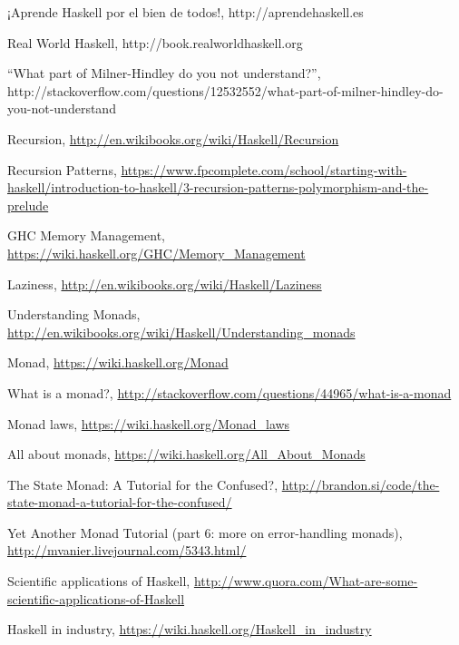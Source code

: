 \documentclass[a4paper]{article}
\begin{document}
\clearpage
\begin{thebibliography}{3}

  ¡Aprende Haskell por el bien de todos!, http://aprendehaskell.es

  Real World Haskell, http://book.realworldhaskell.org

  “What part of Milner-Hindley do you not understand?”, http://stackoverflow.com/questions/12532552/what-part-of-milner-hindley-do-you-not-understand

  Recursion, \url{http://en.wikibooks.org/wiki/Haskell/Recursion}

  Recursion Patterns,
  \url{https://www.fpcomplete.com/school/starting-with-haskell/introduction-to-haskell/3-recursion-patterns-polymorphism-and-the-prelude}

  GHC Memory Management, \url{https://wiki.haskell.org/GHC/Memory_Management}

  Laziness, \url{http://en.wikibooks.org/wiki/Haskell/Laziness}

  Understanding Monads, \url{http://en.wikibooks.org/wiki/Haskell/Understanding_monads}

  Monad, \url{https://wiki.haskell.org/Monad}

  What is a monad?, \url{http://stackoverflow.com/questions/44965/what-is-a-monad}

  Monad laws, \url{https://wiki.haskell.org/Monad_laws}

  All about monads, \url{https://wiki.haskell.org/All_About_Monads}

  The State Monad: A Tutorial for the Confused?, \url{http://brandon.si/code/the-state-monad-a-tutorial-for-the-confused/}

  Yet Another Monad Tutorial (part 6: more on error-handling monads), \url{http://mvanier.livejournal.com/5343.html/}

  Scientific applications of Haskell, \url{http://www.quora.com/What-are-some-scientific-applications-of-Haskell}

  Haskell in industry, \url{https://wiki.haskell.org/Haskell_in_industry}

\end{thebibliography}
\end{document}
